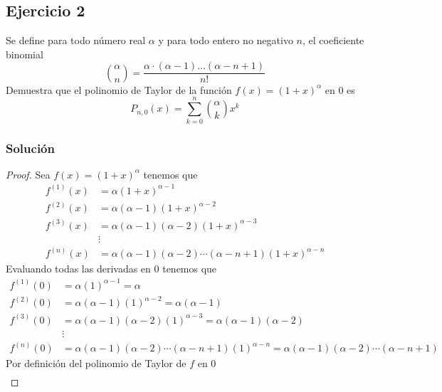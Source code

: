 \documentclass[a4paper]{article}
\begin{document}
\subsection{Ejercicio 2}
\noindent
Se define para todo número real \(\alpha\) y para todo entero no negativo \(n\), el coeficiente 
binomial
\[
    \binom{\alpha}{n} = \frac{\alpha \cdot \left(\alpha - 1\right) \dotsc \left(\alpha - n + 1\right)}{n!}
\]
Demuestra que el polinomio de Taylor de la función \(f(x) = \left(1 + x\right)^{\alpha}\) en \(0\)
es
\[
    P_{n, 0}(x) = \sum_{k = 0}^{n} \binom{\alpha}{k} x^{k}
\]
\subsubsection*{Solución}
\begin{proof}
    Sea \(f(x) = \left(1 + x\right)^{\alpha}\) tenemos que 
    \begin{align*}
        f^{(1)}(x) &= \alpha\left(1 + x\right)^{\alpha - 1} \\
        f^{(2)}(x) &= \alpha\left(\alpha - 1\right)\left(1 + x\right)^{\alpha - 2} \\
        f^{(3)}(x) &= \alpha\left(\alpha - 1\right)\left(\alpha - 2\right)\left(1 + x\right)^{\alpha - 3} \\
        &\vdots \\
        f^{(n)}(x) &= \alpha\left(\alpha - 1\right)\left(\alpha - 2\right) \cdots \left(\alpha - n + 1\right)\left(1 + x\right)^{\alpha - n}
    \end{align*}
    Evaluando todas las derivadas en \(0\) tenemos que 
    \begin{align*}
        f^{(1)}(0) &= \alpha\left(1\right)^{\alpha - 1} = \alpha \\
        f^{(2)}(0) &= \alpha\left(\alpha - 1\right)\left(1\right)^{\alpha - 2} = \alpha\left(\alpha - 1\right) \\
        f^{(3)}(0) &= \alpha\left(\alpha - 1\right)\left(\alpha - 2\right)\left(1\right)^{\alpha - 3} = \alpha\left(\alpha - 1\right)\left(\alpha - 2\right) \\
        &\vdots \\
        f^{(n)}(0) &= \alpha\left(\alpha - 1\right)\left(\alpha - 2\right) \cdots \left(\alpha - n + 1\right)\left(1\right)^{\alpha - n} = \alpha\left(\alpha - 1\right)\left(\alpha - 2\right) \cdots \left(\alpha - n + 1\right)
    \end{align*}
    Por definición del polinomio de Taylor de \(f\) en \(0\)
    \begin{align*}

\end{align*}
\end{proof}
\end{document}
